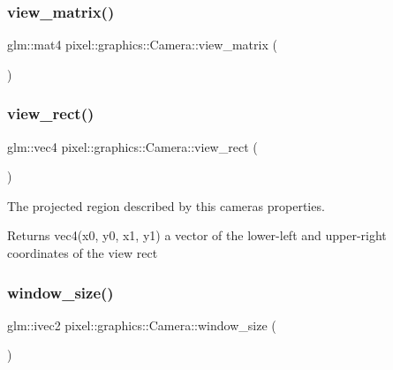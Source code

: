\mbox{\label{classpixel_1_1graphics_1_1_camera_ad89dd217ea5d1ca681006893fabbbd7d}} 
\subsubsection{\texorpdfstring{view\+\_\+matrix()}{view\_matrix()}}
{\footnotesize\ttfamily glm\+::mat4 pixel\+::graphics\+::\+Camera\+::view\+\_\+matrix (\begin{DoxyParamCaption}{ }\end{DoxyParamCaption})}

\mbox{\label{classpixel_1_1graphics_1_1_camera_a6b14915efaefd421f2cafa2cef532d45}} 
\subsubsection{\texorpdfstring{view\+\_\+rect()}{view\_rect()}}
{\footnotesize\ttfamily glm\+::vec4 pixel\+::graphics\+::\+Camera\+::view\+\_\+rect (\begin{DoxyParamCaption}{ }\end{DoxyParamCaption})}



The projected region described by this camera\textquotesingle{}s properties. 

\begin{DoxyReturn}{Returns}
vec4(x0, y0, x1, y1) a vector of the lower-\/left and upper-\/right coordinates of the view rect 
\end{DoxyReturn}
\mbox{\label{classpixel_1_1graphics_1_1_camera_aa8bad1ecf68611262195b74f42151922}} 
\subsubsection{\texorpdfstring{window\+\_\+size()}{window\_size()}}
{\footnotesize\ttfamily glm\+::ivec2 pixel\+::graphics\+::\+Camera\+::window\+\_\+size (\begin{DoxyParamCaption}{ }\end{DoxyParamCaption})}



